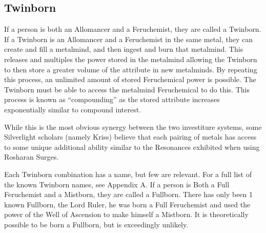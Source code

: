\documentclass[conference]{IEEEtran}
\begin{document}
\subsection*{\textbf{Twinborn}}
If a person is both an Allomancer and a Feruchemist, they are called a Twinborn.\cite{AoL-CH1}    
If a Twinborn is an Allomancer and a Feruchemist in the same metal, they can create and fill a metalmind, and then ingest and burn that metalmind.  This releases and multiples the power stored in the metalmind allowing the Twinborn to then store a greater volume of the attribute in new metalminds.  By repeating this process, an unlimited amount of stored Feruchemical power is possible.\cite{AoL-CH11}  The Twinborn must be able to access the metalmind Feruchemical to do this.\cite{TFE-CH29}  This process is known as ``compounding'' as the stored attribute increases exponentially similar to compound interest.\cite{AoL-CH11}

While this is the most obvious synergy between the two investiture systems, some Silverlight scholars (namely Kriss) believe that each pairing of metals has access to some unique additional ability similar to the Resonances exhibited when using Rosharan Surges.\cite{ARS}

Each Twinborn combination has a name, but few are relevant.  For a full list of the known Twinborn names, see Appendix A.\cite{MBARPG}
If a person is Both a Full Feruchemist and a Mistborn, they are called a Fullborn.\cite{fullborn}  There has only been 1 known Fullborn, the Lord Ruler, he was born a Full Feruchemist\cite{TFE-EP} and used the power of the Well of Ascension to make himself a Mistborn.\cite{well-mistborn} 
It is theoretically possible to be born a Fullborn, but is exceedingly  unlikely.\cite{bornfull}
\end{document}
